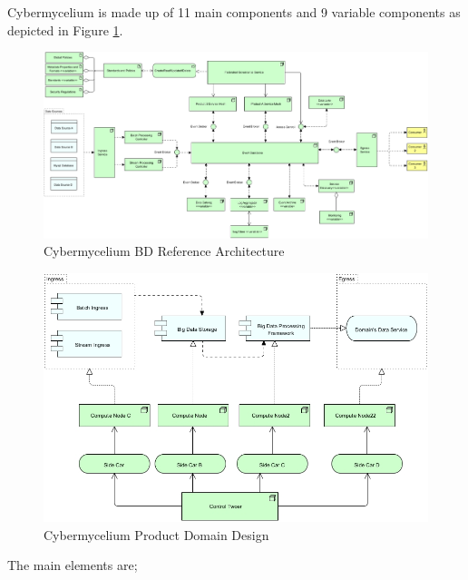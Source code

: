 \documentclass[review]{elsarticle}
\begin{document}
Cybermycelium is made up of 11 main components and 9 variable components as depicted in Figure \ref{fig:Cybermycelium}.




\begin{figure}
        \includegraphics[width=23cm]{Media/Cybermycelium.jpg}
        \caption{Cybermycelium BD Reference Architecture}
        \label{fig:Cybermycelium}
\end{figure}


\begin{figure}[h!]
    \centering
    \includegraphics[width=12cm]{Media/Product Domain.jpg}
    \caption{Cybermycelium Product Domain Design}
    \label{fig:Cybermycelium Product Domain Design}
\end{figure}


The main elements are;
\end{document}
